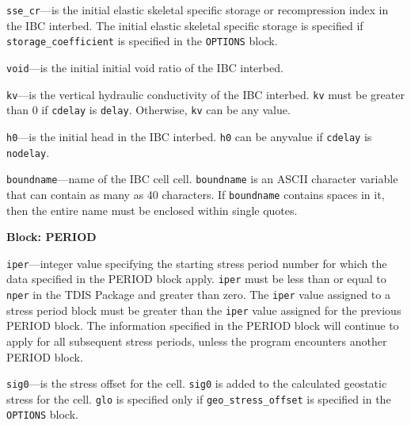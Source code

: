 \begin{description}
\item \texttt{sse\_cr}---is the initial elastic skeletal specific storage or recompression index in the IBC interbed. The initial elastic skeletal specific storage is specified if \texttt{storage\_coefficient} is specified in the \texttt{OPTIONS} block.

\item \texttt{void}---is the initial initial void ratio of the IBC interbed.

\item \texttt{kv}---is the vertical hydraulic conductivity of the IBC interbed. \texttt{kv} must be greater than 0 if \texttt{cdelay} is \texttt{delay}. Otherwise, \texttt{kv} can be any value.

\item \texttt{h0}---is the initial head in the IBC interbed. \texttt{h0} can be anyvalue if \texttt{cdelay} is \texttt{nodelay}.

\item \texttt{boundname}---name of the IBC cell cell.  \texttt{boundname} is an ASCII character variable that can contain as many as 40 characters.  If \texttt{boundname} contains spaces in it, then the entire name must be enclosed within single quotes.

\end{description}
\item \textbf{Block: PERIOD}

\begin{description}
\item \texttt{iper}---integer value specifying the starting stress period number for which the data specified in the PERIOD block apply.  \texttt{iper} must be less than or equal to \texttt{nper} in the TDIS Package and greater than zero.  The \texttt{iper} value assigned to a stress period block must be greater than the \texttt{iper} value assigned for the previous PERIOD block.  The information specified in the PERIOD block will continue to apply for all subsequent stress periods, unless the program encounters another PERIOD block.

\item \texttt{sig0}---is the stress offset for the cell. \texttt{sig0} is added to the calculated geostatic stress for the cell. \texttt{glo} is specified only if \texttt{geo\_stress\_offset} is specified in the \texttt{OPTIONS} block.

\end{description}

